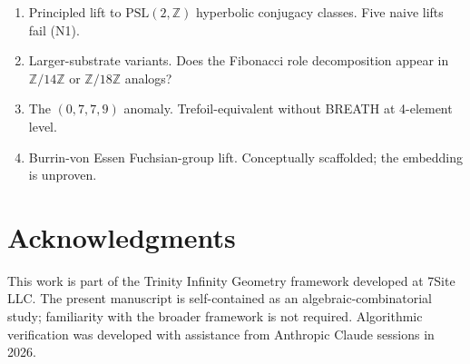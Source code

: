 \documentclass[11pt,reqno]{amsart}
\theoremstyle{plain}
\theoremstyle{definition}
\theoremstyle{remark}
\newcommand{\Z}{\mathbb{Z}}
\begin{document}
\begin{enumerate}
\item Principled lift to $\mathrm{PSL}(2, \Z)$ hyperbolic conjugacy
classes. Five naive lifts fail (N1).
\item Larger-substrate variants. Does the Fibonacci role decomposition
appear in $\Z/14\Z$ or $\Z/18\Z$ analogs?
\item The $(0, 7, 7, 9)$ anomaly. Trefoil-equivalent without BREATH at
4-element level.
\item Burrin-von Essen Fuchsian-group lift. Conceptually scaffolded;
the embedding is unproven.
\end{enumerate}

\section*{Acknowledgments}

This work is part of the Trinity Infinity Geometry framework developed
at 7Site LLC. The present manuscript is self-contained as an
algebraic-combinatorial study; familiarity with the broader framework
is not required. Algorithmic verification was developed with assistance
from Anthropic Claude sessions in 2026.
\end{document}
